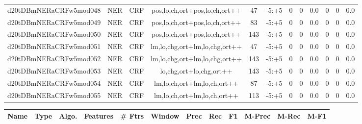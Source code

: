 \documentclass[a4paper]{article}
\begin{document}
\begin{landscape}
\begin{center}
\begin{tabular}{ |c|c|c|c|c|c|c|c|c|c|c|c|}
 
 	
 	\small{ d20tDBmNERaCRFw5mod048 } & \small{ NER} & \small{  CRF }  & pos,lo,ch,ort+pos,lo,ch,ort++  &  47 &  \small{  -5:+5 }  &  0 & 0 & 0.0  &  0 & 0 & 0.0 \\
 	

 
 	
 	\small{ d20tDBmNERaCRFw5mod049 } & \small{ NER} & \small{  CRF }  & pos,lo,ch,ort+pos,lo,ch,ort++  &  83 &  \small{  -5:+5 }  &  0 & 0 & 0.0  &  0 & 0 & 0.0 \\
 	

 
 	
 	\small{ d20tDBmNERaCRFw5mod050 } & \small{ NER} & \small{  CRF }  & pos,lo,ch,ort+pos,lo,ch,ort++  &  143 &  \small{  -5:+5 }  &  0 & 0 & 0.0  &  0 & 0 & 0.0 \\
 	

 
 	
 	\small{ d20tDBmNERaCRFw5mod051 } & \small{ NER} & \small{  CRF }  & lm,lo,chg,ort+lm,lo,chg,ort++  &  47 &  \small{  -5:+5 }  &  0 & 0 & 0.0  &  0 & 0 & 0.0 \\
 	

 
 	
 	\small{ d20tDBmNERaCRFw5mod052 } & \small{ NER} & \small{  CRF }  & lm,lo,chg,ort+lm,lo,chg,ort++  &  143 &  \small{  -5:+5 }  &  0 & 0 & 0.0  &  0 & 0 & 0.0 \\
 	

 
 	
 	\small{ d20tDBmNERaCRFw5mod053 } & \small{ NER} & \small{  CRF }  & lo,chg,ort+lo,chg,ort++  &  143 &  \small{  -5:+5 }  &  0 & 0 & 0.0  &  0 & 0 & 0.0 \\
 	

 
 	
 	\small{ d20tDBmNERaCRFw5mod054 } & \small{ NER} & \small{  CRF }  & lm,lo,ch,ort+lm,lo,ch,ort++  &  87 &  \small{  -5:+5 }  &  0 & 0 & 0.0  &  0 & 0 & 0.0 \\
 	

 
 	
 	\small{ d20tDBmNERaCRFw5mod055 } & \small{ NER} & \small{  CRF }  & lm,lo,ch,ort+lm,lo,ch,ort++  &  113 &  \small{  -5:+5 }  &  0 & 0 & 0.0  &  0 & 0 & 0.0 \\
 	
 \hline
\end{tabular}
\end{center}




\begin{center}
\begin{tabular}{ |c|c|c|c|c|c|c|c|c|c|c|c|} 
 \hline
 	Name & Type & Algo. & Features & \# Ftrs & Window & Prec & Rec & F1 & M-Prec & M-Rec & M-F1\\
 \hline


\end{tabular}
\end{center}
\end{landscape}
\end{document}
